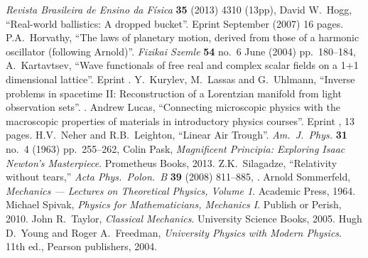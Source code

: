 \begin{thebibliography}{99}
  \emph{Revista Brasileira de Ensino da F\'isica} \textbf{35} 
  (2013) 4310 (13pp), 
  David W.~Hogg, ``Real-world ballistics: A dropped bucket''.
  Eprint  September (2007) 16 pages.
  P.A.~Horvathy,
  ``The laws of planetary motion, derived from those of a harmonic oscillator (following Arnold)''.
  \emph{Fizikai Szemle} \textbf{54} no.~6 June (2004) pp.~180--184,
  A.~Kartavtsev,
  ``Wave functionals of free real and complex scalar fields on a 1+1 dimensional lattice''.
  Eprint .
  Y.~Kurylev, M.~Lassas and G.~Uhlmann,
  ``Inverse problems in spacetime II: Reconstruction of a Lorentzian manifold from light observation sets''.
  .
  Andrew Lucas,
  ``Connecting microscopic physics with the macroscopic properties of materials in introductory physics courses''.
  Eprint , 13 pages.
  H.V.~Neher and R.B.~Leighton,
  ``Linear Air Trough''.
  \emph{Am.\ J.\ Phys.} {\bf 31} no.~4 (1963) pp.~255--262,
  Colin Pask,
  \emph{Magnificent Principia: Exploring Isaac Newton's Masterpiece}.
  Prometheus Books, 2013.
  Z.K.~Silagadze,
  ``Relativity without tears,''
  \emph{Acta Phys.~Polon.~B} {\bf 39} (2008) 811--885,
  .
  Arnold Sommerfeld,
  \emph{Mechanics --- Lectures on Theoretical Physics, Volume 1}.
  Academic Press, 1964.
  Michael Spivak,
  \emph{Physics for Mathematicians, Mechanics I}.
  Publish or Perish, 2010.
  John R.~Taylor,
  \emph{Classical Mechanics}.
  University Science Books, 2005.
  Hugh D.~Young and Roger A.~Freedman,
  \emph{University Physics with Modern Physics}.
  11th ed., Pearson publishers, 2004.
\end{thebibliography}
